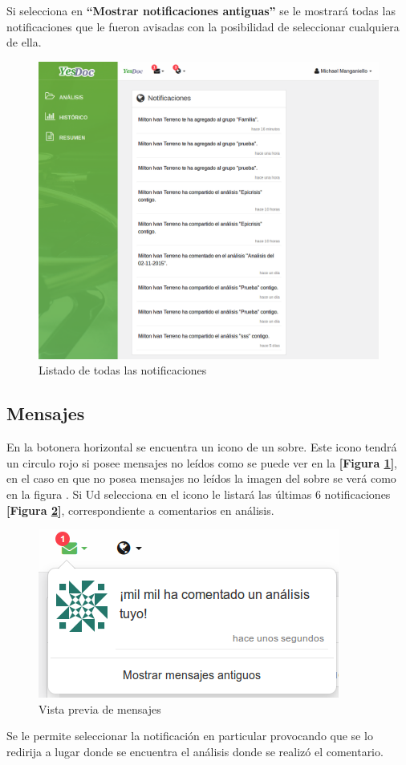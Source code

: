 Si selecciona en \textbf{``Mostrar notificaciones antiguas''} se le mostrará todas las notificaciones que le fueron avisadas con la posibilidad de seleccionar cualquiera de ella.

\begin{figure}
	\centering
	\includegraphics[width=.8\textwidth]{img/manual_de_usuario/lista_notificaciones}
	\caption{Listado de todas las notificaciones}
	\label{mu-lista_notificaciones}
\end{figure}



\subsection{Mensajes}
En la botonera horizontal se encuentra un icono de un sobre. Este icono tendrá un circulo rojo si posee mensajes no leídos  como se puede ver en la \textbf{[Figura \ref{mu-lista_notificaciones}]}, en el caso en que no posea mensajes no leídos la imagen del sobre se verá como en la figura . Si Ud selecciona en el icono le listará las últimas 6 notificaciones \textbf{[Figura \ref{mu-mensajes_vista_previa}]}, correspondiente a  comentarios en análisis. 
\begin{figure}
	\centering
	\includegraphics[width=.8\textwidth]{img/manual_de_usuario/mensajes_vista_previa}
	\caption{Vista previa de mensajes}
	\label{mu-mensajes_vista_previa}
\end{figure}
Se le permite seleccionar la notificación en particular provocando que se lo redirija a lugar donde se encuentra el análisis donde se realizó el comentario.

